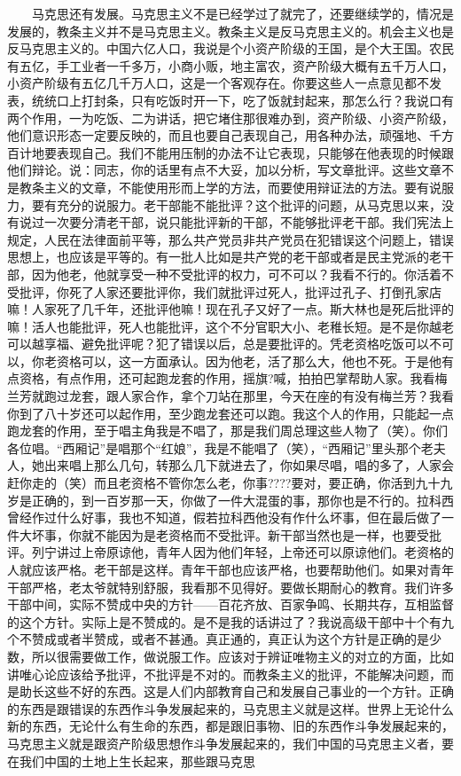 \documentclass[cn,11pt,chinese]{elegantbook}
\begin{document}
　　马克思还有发展。马克思主义不是已经学过了就完了，还要继续学的，情况是发展的，教条主义并不是马克思主义。教条主义是反马克思主义的。机会主义也是反马克思主义的。中国六亿人口，我说是个小资产阶级的王国，是个大王国。农民有五亿，手工业者一千多万，小商小贩，地主富农，资产阶级大概有五千万人口，小资产阶级有五亿几千万人口，这是一个客观存在。你要这些人一点意见都不发表，统统口上打封条，只有吃饭时开一下，吃了饭就封起来，那怎么行？我说口有两个作用，一为吃饭、二为讲话，把它堵住那很难办到，资产阶级、小资产阶级，他们意识形态一定要反映的，而且也要自己表现自己，用各种办法，顽强地、千方百计地要表现自己。我们不能用压制的办法不让它表现，只能够在他表现的时候跟他们辩论。说：同志，你的话里有点不大妥，加以分析，写文章批评。这些文章不是教条主义的文章，不能使用形而上学的方法，而要使用辩证法的方法。要有说服力，要有充分的说服力。老干部能不能批评？这个批评的问题，从马克思以来，没有说过一次要分清老干部，说只能批评新的干部，不能够批评老干部。我们宪法上规定，人民在法律面前平等，那么共产党员非共产党员在犯错误这个问题上，错误思想上，也应该是平等的。有一批人比如是共产党的老干部或者是民主党派的老干部，因为他老，他就享受一种不受批评的权力，可不可以？我看不行的。你活着不受批评，你死了人家还要批评你，我们就批评过死人，批评过孔子、打倒孔家店嘛！人家死了几千年，还批评他嘛！现在孔子又好了一点。斯大林也是死后批评的嘛！活人也能批评，死人也能批评，这个不分官职大小、老稚长短。是不是你越老可以越享福、避免批评呢？犯了错误以后，总是要批评的。凭老资格吃饭可以不可以，你老资格可以，这一方面承认。因为他老，活了那么大，他也不死。于是他有点资格，有点作用，还可起跑龙套的作用，摇旗?喊，拍拍巴掌帮助人家。我看梅兰芳就跑过龙套，跟人家合作，拿个刀站在那里，今天在座的有没有梅兰芳？我看你到了八十岁还可以起作用，至少跑龙套还可以跑。我这个人的作用，只能起一点跑龙套的作用，至于唱主角我是不唱了，那是我们周总理这些人物了（笑）。你们各位唱。“西厢记”是唱那个“红娘”，我是不能唱了（笑），“西厢记”里头那个老夫人，她出来唱上那么几句，转那么几下就进去了，你如果尽唱，唱的多了，人家会赶你走的（笑）而且老资格不管你怎么老，你事????要对，要正确，你活到九十九岁是正确的，到一百岁那一天，你做了一件大混蛋的事，那你也是不行的。拉科西曾经作过什么好事，我也不知道，假若拉科西他没有作什么坏事，但在最后做了一件大坏事，你就不能因为是老资格而不受批评。新干部当然也是一样，也要受批评。列宁讲过上帝原谅他，青年人因为他们年轻，上帝还可以原谅他们。老资格的人就应该严格。老干部是这样。青年干部也应该严格，也要帮助他们。如果对青年干部严格，老太爷就特别舒服，我看那不见得好。要做长期耐心的教育。我们许多干部中间，实际不赞成中央的方针——百花齐放、百家争鸣、长期共存，互相监督的这个方针。实际上是不赞成的。是不是我的话讲过了？我说高级干部中十个有九个不赞成或者半赞成，或者不甚通。真正通的，真正认为这个方针是正确的是少数，所以很需要做工作，做说服工作。应该对于辨证唯物主义的对立的方面，比如讲唯心论应该给予批评，不批评是不对的。而教条主义的批评，不能解决问题，而是助长这些不好的东西。这是人们内部教育自己和发展自己事业的一个方针。正确的东西是跟错误的东西作斗争发展起来的，马克思主义就是这样。世界上无论什么新的东西，无论什么有生命的东西，都是跟旧事物、旧的东西作斗争发展起来的，马克思主义就是跟资产阶级思想作斗争发展起来的，我们中国的马克思主义者，要在我们中国的土地上生长起来，那些跟马克思
\end{document}
